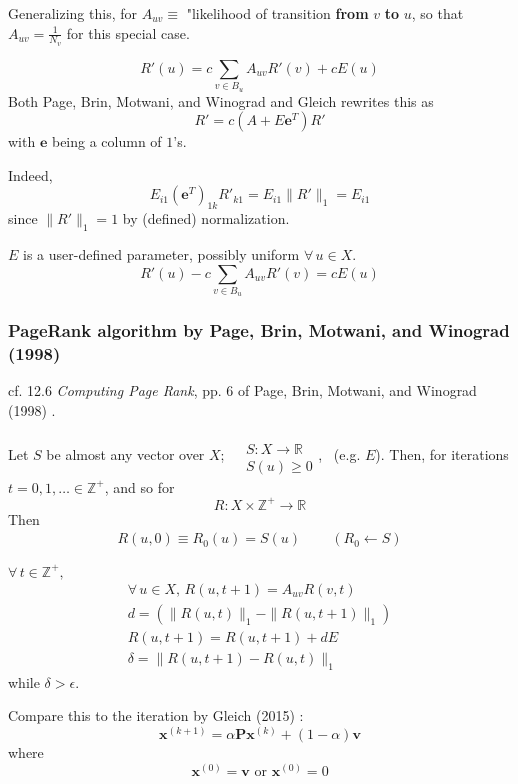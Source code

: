 \documentclass[10pt]{amsart}
\begin{document}
\begin{multicols*}{2}
Generalizing this, for $A_{uv} \equiv $ "likelihood of transition \textbf{from} $v$ \textbf{to } $u$, so that $A_{uv} = \frac{1}{N_v}$ for this special case.  

\[
R'(u) = c\sum_{v\in B_u } A_{uv} R'(v) + cE(u)
\]
Both Page, Brin, Motwani, and Winograd and Gleich rewrites this as 
\[
R' = c(A + E\mathbf{e}^T)R'
\]
with $\mathbf{e}$ being a column of $1$'s.  

Indeed, 
\[
E_{i1} (\mathbf{e}^T)_{1k} R'_{k1} = E_{i1} \| R' \|_1 = E_{i1} 
\]
since $\| R' \|_1=1$ by (defined) normalization.  

$E$ is a user-defined parameter, possibly uniform $\forall \, u \in X$.  
\begin{equation}
R'(u) - c\sum_{v\in B_u} A_{uv} R'(v) = cE(u)
\end{equation}

\subsubsection{PageRank algorithm by Page, Brin, Motwani, and Winograd (1998) \cite{PBMW1998}}
	
cf. 12.6 \emph{Computing Page Rank}, pp. 6 of Page, Brin, Motwani, and Winograd (1998) \cite{PBMW1998}.  

Let $S$ be almost any vector over $X$; $\begin{aligned} & \quad \\
	& S:X \to \mathbb{R} \\
	& S(u) \geq 0 \end{aligned}$, \, (e.g. $E$).  Then, for iterations $t= 0,1,\dots \in \mathbb{Z}^+$, 
and so for 
\[
R: X \times \mathbb{Z}^+ \to \mathbb{R}
\]
Then 
\[
\begin{gathered}
R(u,0) \equiv R_0(u) = S(u)  \qquad \, (R_0 \leftarrow  S)
\end{gathered}
\]

$ \forall \, t \in \mathbb{Z}^+, \,$ 
\[
\begin{gathered}
	 \forall \, u \in X, \, R(u,t+1) = A_{uv} R(v,t)  \\
	d= ( \| R(u,t) \|_1 - \| R(u,t+1) \|_1 ) \\
	R(u,t+1) = R(u,t+1)+dE \\
	\delta = \| R(u,t+1) - R(u,t) \|_1 
\end{gathered}
\]
while $\delta > \epsilon$.  

Compare this to the iteration by Gleich (2015) \cite{Glei2015}: 
\begin{equation}
\mathbf{x}^{(k+1)} = \alpha \mathbf{P} \mathbf{x}^{(k)} + (1-\alpha) \mathbf{v} 
\end{equation}
where
\[
\mathbf{x}^{(0)} = \mathbf{v} \text{ or } \mathbf{x}^{(0)} = 0
\]


\end{multicols*}
\end{document}
